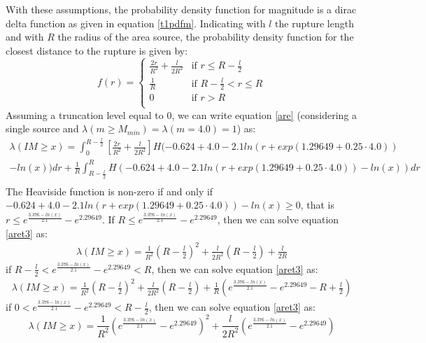 With these assumptions, the probability density function for magnitude is a
dirac delta function as given in equation \ref{t1pdfm}. 
%
Indicating with $l$ the rupture length and with $R$ the radius of the area
source, the probability density function for the closest distance to the rupture
is given by:
\begin{equation}
f(r) = 
\begin{cases}
\frac{2r}{R^{2}} + \frac{l}{2R^{2}} & \text{if } r \leq R - \frac{l}{2} \\
\frac{1}{R}         & \text{if } R - \frac{l}{2} < r \leq R \\
0                         &   \text{if } r > R \\
\end{cases}
\end{equation}
Assuming a truncation level equal to 0, we can write equation \ref{are} (considering a single source and $\lambda(m\geq M_{min}) = \lambda(m=4.0) = 1$) as:
\begin{eqnarray}
    \label{aret3}
    \lambda(IM \geq x) = \int_{0}^{R-\frac{l}{2}}\left[\frac{2r}{R^{2}} +
    \frac{l}{2R^{2}}\right] H(-0.624 + 4.0 - 2.1 ln(r + exp(1.29649 + 0.25 \cdot
    4.0)) \nonumber \\
    - ln(x))dr + \frac{1}{R}\int_{R - \frac{l}{2}}^{R}H(-0.624 + 4.0 - 2.1 ln(r
    + exp(1.29649 + 0.25 \cdot 4.0)) - ln(x))dr \nonumber \\
\end{eqnarray}
The Heaviside function is non-zero if and only if $-0.624 + 4.0 - 2.1 ln(r + exp(1.29649 + 0.25 \cdot 4.0)) - ln(x) \geq 0$, that is $r \leq e^{\frac{3.376 - ln(x)}{2.1}} - e^{2.29649}$.
If $R\leq e^{\frac{3.376 - ln(x)}{2.1}} - e^{2.29649}$, then we can solve equation \ref{aret3} as:
\begin{eqnarray}
\label{aret3case1}
\lambda(IM \geq x) = \frac{1}{R^{2}}(R - \frac{l}{2})^{2} + \frac{l}{2R^{2}}(R - \frac{l}{2}) + \frac{l}{2R}
\end{eqnarray}
if $R-\frac{l}{2}< e^{\frac{3.376 - ln(x)}{2.1}} - e^{2.29649} < R$, then we can solve equation \ref{aret3} as:
\begin{eqnarray}
\label{aret3case2}
\lambda(IM \geq x) = \frac{1}{R^{2}}(R - \frac{l}{2})^{2} + \frac{l}{2R^{2}}(R - \frac{l}{2}) + \frac{1}{R}(e^{\frac{3.376 - ln(x)}{2.1}} - e^{2.29649} - R + \frac{l}{2})
\end{eqnarray}
if $0 < e^{\frac{3.376 - ln(x)}{2.1}} - e^{2.29649} < R - \frac{l}{2} $, then we can solve equation \ref{aret3} as:
\begin{equation}
\label{aret3case3}
\lambda(IM \geq x) = \frac{1}{R^{2}} (e^{\frac{3.376 - ln(x)}{2.1}} - e^{2.29649})^{2} + \frac{l}{2R^{2}}(e^{\frac{3.376 - ln(x)}{2.1}} - e^{2.29649})
\end{equation}
